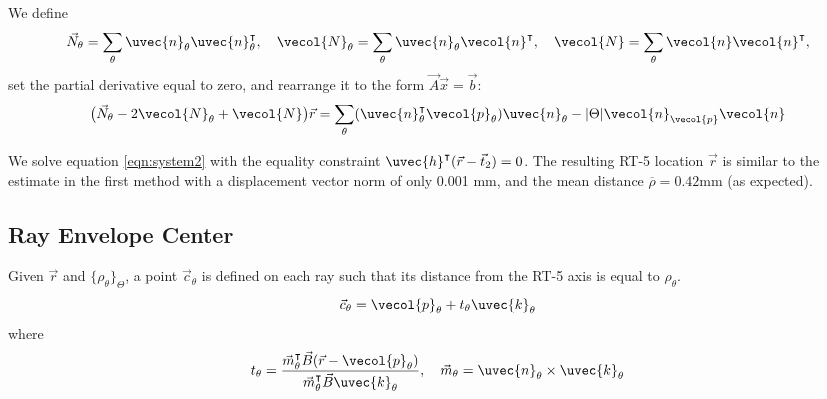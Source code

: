 %
We define
\begin{gather}
    \vec{N}_\theta = \sum_\theta \uvec{n}_\theta \uvec{n}_\theta^\intercal, \quad \vecol{N}_\theta = \sum_\theta \uvec{n}_\theta \vecol{n}^\intercal, \quad
    \vecol{N} = \sum_\theta \vecol{n} \vecol{n}^\intercal,
\end{gather}
%
set the partial derivative equal to zero, and rearrange it to the form $\vec{A}\vec{x} = \vec{b}$:
\begin{equation}
    \big( \vec{N}_\theta - 2\vecol{N}_\theta + \vecol{N} \big) \vec{r} = \sum_\theta (\uvec{n}_\theta^\intercal \vecol{p}_\theta) \uvec{n}_\theta - |\Theta| \vecol{n}_{\vecol{p}} \vecol{n}
    \label{eqn:system2}
\end{equation}

We solve equation \ref{eqn:system2} with the equality constraint $\uvec{h}^\intercal (\vec{r} - \vec{t}_2) = 0$. The resulting RT-5 location $\vec{r}$ is similar to the estimate in the first method with a displacement vector norm of only 0.001 mm, and the mean distance $\overline{\rho} = 0.42$mm (as expected). 

\subsection{Ray Envelope Center}
Given $\vec{r}$ and $\{\rho_\theta\}_\Theta$, a point $\vec{c}_\theta$ is defined on each ray such that its distance from the RT-5 axis is equal to $\rho_\theta$.
\begin{equation}
    \vec{c}_\theta = \vecol{p}_\theta + t_\theta \uvec{k}_\theta
\end{equation}
where
\begin{gather}
    t_\theta = \frac{\vec{m}_\theta^\intercal \vec{B}(\vec{r} - \vecol{p}_\theta)}{\vec{m}_\theta^\intercal \vec{B}\uvec{k}_\theta}, \quad \vec{m}_\theta = \uvec{n}_\theta \times \uvec{k}_\theta
\end{gather}

